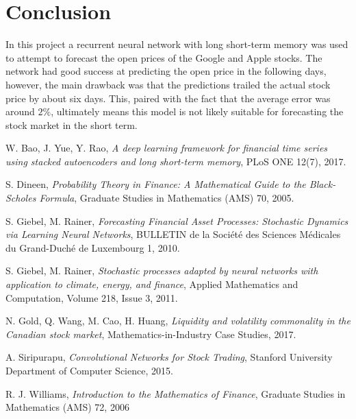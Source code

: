 \documentclass[12pt]{article}
\begin{document}
\section{Conclusion}

In this project a recurrent neural network with long short-term memory was used to attempt to forecast the open prices of the Google and Apple stocks. The network had good success at predicting the open price in the following days, however, the main drawback was that the predictions trailed the actual stock price by about six days. This, paired with the fact that the average error was around $2\%$, ultimately means this model is not likely suitable for forecasting the stock market in the short term.

\newpage
\begin{thebibliography}{99}

W. Bao, J. Yue, Y. Rao, \emph{A deep learning framework for financial time series using stacked autoencoders and long short-term memory}, PLoS ONE 12(7), 2017.

S. Dineen, \emph{Probability Theory in Finance: A Mathematical Guide to the Black-Scholes Formula}, Graduate Studies in Mathematics (AMS) 70, 2005.

S. Giebel, M. Rainer, \emph{Forecasting Financial Asset Processes: Stochastic Dynamics via Learning Neural Networks}, BULLETIN de la Soci\'{e}t\'{e} des Sciences M\'{e}dicales du Grand-Duch\'{e} de Luxembourg 1, 2010.

S. Giebel, M. Rainer, \emph{Stochastic processes adapted by neural networks with application to climate, energy, and finance}, Applied Mathematics and Computation, Volume 218, Issue 3, 2011.

N. Gold, Q. Wang, M. Cao, H. Huang, \emph{Liquidity and volatility commonality in the Canadian stock market}, Mathematics-in-Industry Case Studies, 2017.

A. Siripurapu, \emph{Convolutional Networks for Stock Trading}, Stanford University Department of Computer Science, 2015.

R. J. Williams, \emph{Introduction to the Mathematics of Finance}, Graduate Studies in Mathematics (AMS) 72, 2006

\end{thebibliography}
\end{document}
